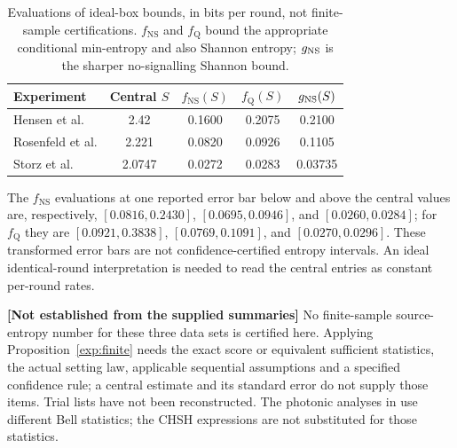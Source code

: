 \documentclass[11pt,a4paper]{article}
\theoremstyle{definition}
\theoremstyle{remark}\newtheorem{remark}[theorem]{Remark}
\newcommand{\status}[1]{\textbf{[#1]}\quad}
\newcommand{\fNS}{f_{\mathrm{NS}}}
\newcommand{\fQ}{f_{\mathrm{Q}}}
\begin{document}
\begin{table}[htbp]\centering\small
\begin{tabular}{@{}lcccc@{}}\toprule
Experiment & Central $S$ & $\fNS(S)$ & $\fQ(S)$ & $g_{\rm NS}(S)$\\\midrule
Hensen et al. & 2.42 & 0.1600 & 0.2075 & 0.2100\\
Rosenfeld et al. & 2.221 & 0.0820 & 0.0926 & 0.1105\\
Storz et al. & 2.0747 & 0.0272 & 0.0283 & 0.03735\\\bottomrule
\end{tabular}
\caption{Evaluations of ideal-box bounds, in bits per round, not finite-sample certifications. $\fNS$ and $\fQ$ bound the appropriate conditional min-entropy and also Shannon entropy; $g_{\rm NS}$ is the sharper no-signalling Shannon bound.}\label{exp:table}
\end{table}
The $\fNS$ evaluations at one reported error bar below and above the central values are, respectively, $[0.0816,0.2430]$, $[0.0695,0.0946]$, and $[0.0260,0.0284]$; for $\fQ$ they are $[0.0921,0.3838]$, $[0.0769,0.1091]$, and $[0.0270,0.0296]$. These transformed error bars are not confidence-certified entropy intervals. An ideal identical-round interpretation is needed to read the central entries as constant per-round rates.

\status{Not established from the supplied summaries}
No finite-sample source-entropy number for these three data sets is certified here. Applying Proposition~\ref{exp:finite} needs the exact score or equivalent sufficient statistics, the actual setting law, applicable sequential assumptions and a specified confidence rule; a central estimate and its standard error do not supply those items. Trial lists have not been reconstructed. The photonic analyses in \cite{Giustina15,Shalm15} use different Bell statistics; the CHSH expressions are not substituted for those statistics.
\end{document}
